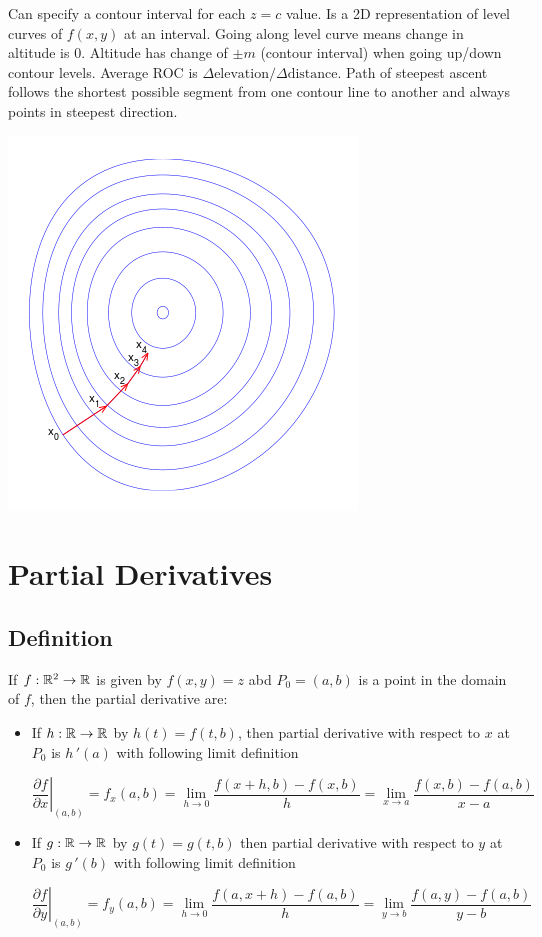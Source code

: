 Can specify a contour interval for each $z=c$ value. Is a 2D representation of
level curves of $f(x,y)$ at an interval. Going along level curve means change in altitude is
0. Altitude has change of $\pm m$ (contour interval) when going up/down contour levels. Average ROC is $\Delta \text{elevation}/\Delta \text{distance}$.
Path of steepest ascent follows the shortest possible segment from one contour line to another and always points in steepest direction.

\begin{center}
    \includegraphics[scale=0.3]{figures/steepest-ascent.png}
\end{center}

\section{Partial Derivatives}

\subsection{Definition}

If $f:\mathbb{R}^2\rightarrow \mathbb{R}$ is given by $f(x,y)=z$ abd $P_0=(a,b)$ is a point in the domain of $f$,
then the partial derivative are:
\begin{itemize}
    \item If $h:\mathbb{R}\rightarrow \mathbb{R}$ by $h(t)=f(t,b)$, then partial derivative with respect to $x$ at $P_0$
    is $h\,'(a)$ with following limit definition

    \[\left.\frac{\partial f}{\partial x}\right|_{(a, b)}=f_{x}(a, b)=\lim _{h \rightarrow 0} \frac{f(x+h, b)-f(x, b)}{h}=\lim _{x \rightarrow a} \frac{f(x, b)-f(a, b)}{x-a}\]

    \item If $g:\mathbb{R}\rightarrow \mathbb{R}$ by $g(t)=g(t,b)$ then partial derivative with respect to $y$ at $P_0$ is $g\,'(b)$ with following limit definition
    
    \[\left.\frac{\partial f}{\partial y}\right|_{(a, b)}=f_{y}(a, b)=\lim _{h \rightarrow 0} \frac{f(a, x+h)-f(a, b)}{h}=\lim _{y \rightarrow b} \frac{f(a, y)-f(a, b)}{y-b}\]

\end{itemize}


